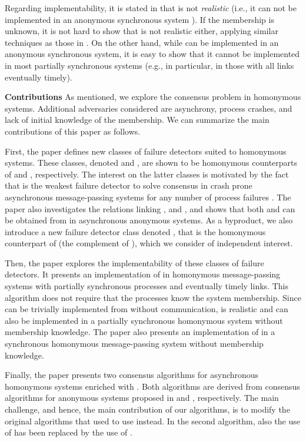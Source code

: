 \documentclass[10pt, conference, compsocconf]{IEEEtran}
\newcommand{\tightparagraph}[1]{\smallskip \noindent \textbf{#1} \hspace{1ex}}
\begin{document}
Regarding implementability, it is stated 
in \cite{DBLP:conf/wdag/BonnetR10} that  is not \emph{realistic}
(i.e., it can not be implemented in an anonymous  synchronous system 
\cite{DBLP:conf/dsn/Delporte-GalletFG02}). If the membership is
unknown, it is not hard to show that  is not realistic either, 
applying similar techniques as those in
\cite{DBLP:journals/ipl/JimenezAF06}. On the other hand, 
while  can be implemented in an anonymous  
synchronous system, it is easy to show that it cannot be 
implemented in most partially synchronous systems 
(e.g., in particular, in those with all links eventually timely).



\tightparagraph{Contributions}
As mentioned, we explore the consensus problem in homonymous systems. 
Additional adversaries considered are
asynchrony, process crashes, and lack of initial knowledge of the membership. 
We can summarize the main contributions of this paper as follows.

First, the paper defines new classes  of failure detectors suited  
to homonymous
systems. These classes, denoted  and  , 
are shown to be homonymous counterparts of   and  , 
respectively.
The interest on the latter classes is motivated by the fact that  
 is the weakest failure detector 
to solve consensus in crash prone asynchronous message-passing systems 
for any  number of  process failures  
\cite{DBLP:journals/jacm/Delporte-GalletFG10}.  
The paper also investigates the relations linking , 
 and  , and shows that both 
 and   can be obtained
from  in asynchronous anonymous systems. 
As a byproduct, we also introduce a new
failure detector class denoted  ,
that is the homonymous counterpart of  
(the complement of     \cite{DBLP:journals/jacm/ChandraT96}),
which we consider of independent interest.

Then, the paper explores the implementability of these classes 
of failure detectors.
It presents an implementation of   in  homonymous message-passing  
systems  with  partially synchronous processes  and eventually timely  links.
This algorithm does  not require that the processes know the system
 membership. 
Since  can be trivially implemented from  without communication,
 is realistic and can also be implemented in a partially synchronous 
homonymous system without membership knowledge. The paper also presents 
an implementation of  
in  a  synchronous homonymous message-passing  system
without membership knowledge.

Finally, the paper presents two consensus algorithms for asynchronous 
homonymous systems enriched with . Both algorithms are derived
from consensus algorithms for anonymous systems proposed in 
\cite{DBLP:conf/aina/BonnetR10} and
\cite{DBLP:conf/wdag/BonnetR10}, respectively. 
The main challenge, and hence, the main contribution
of our algorithms, is to modify the original algorithms that 
used  to use  instead.
In the second algorithm, also the use of  has been 
replaced by the use of .
\end{document}
